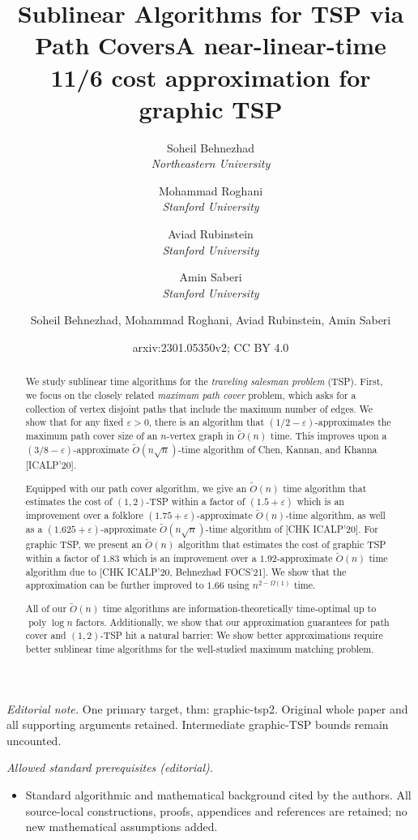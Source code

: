 \documentclass[letterpaper,11pt]{article}
\title{Sublinear Algorithms for TSP via Path Covers}
\author{
 Soheil Behnezhad\\{\em Northeastern University} \and 
 Mohammad Roghani\\{\em Stanford University} \and
 Aviad Rubinstein\\{\em Stanford University} \and
 Amin Saberi\\{\em Stanford University}
 }
\date{}
\title{A near-linear-time 11/6 cost approximation for graphic TSP}
\author{Soheil Behnezhad, Mohammad Roghani, Aviad Rubinstein, Amin Saberi}
\date{arxiv:2301.05350v2; CC BY 4.0}
\renewcommand{\epsilon}{\varepsilon}
\DeclareMathOperator{\poly}{poly}
\begin{document}
\maketitle
\noindent\textit{Editorial note.} One primary target, thm: graphic-tsp2. Original whole paper and all supporting arguments retained. Intermediate graphic-TSP bounds remain uncounted.\par\medskip
\noindent\textit{Allowed standard prerequisites (editorial).}\begin{itemize}
\item Standard algorithmic and mathematical background cited by the authors. All source-local constructions, proofs, appendices and references are retained; no new mathematical assumptions added.
\end{itemize}\medskip

\begin{abstract}
We study sublinear time algorithms for the {\em traveling salesman problem} (TSP). First, we focus on the closely related {\em maximum path cover} problem, which asks for a collection of vertex disjoint paths that include the maximum number of edges. We show that for any fixed $\epsilon > 0$, there is an algorithm that $(1/2 - \epsilon)$-approximates the maximum path cover size of an $n$-vertex graph in $\widetilde{O}(n)$ time. This improves upon a $(3/8-\epsilon)$-approximate $\widetilde{O}(n \sqrt{n})$-time algorithm of Chen, Kannan, and Khanna [ICALP'20].
    
    \medskip
    Equipped with our path cover algorithm, we give an $\widetilde{O}(n)$ time algorithm that estimates the cost of $(1,2)$-TSP within a factor of $(1.5+\epsilon)$ which is an improvement over a folklore $(1.75 + \epsilon)$-approximate $\widetilde{O}(n)$-time algorithm, as well as a $(1.625+\epsilon)$-approximate $\widetilde{O}(n\sqrt{n})$-time algorithm of [CHK ICALP'20]. For graphic TSP, we present an $\widetilde{O}(n)$ algorithm that estimates the cost of graphic TSP within a factor of $1.83$ which is an improvement over a $1.92$-approximate $\widetilde{O}(n)$ time algorithm due to [CHK ICALP'20, Behnezhad FOCS'21]. We show that the approximation can be further improved to $1.66$ using $n^{2-\Omega(1)}$ time.
    
    \medskip    
    All of our $\widetilde{O}(n)$ time algorithms are information-theoretically time-optimal up to $\poly\log n$ factors. Additionally, we show that our approximation guarantees for path cover and $(1,2)$-TSP hit a natural barrier: We show better approximations require better sublinear time algorithms for the well-studied maximum matching problem.
\end{abstract}
\end{document}
